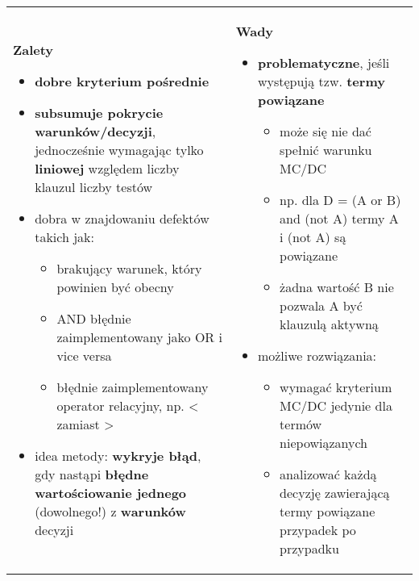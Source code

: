 \documentclass[../main.tex]{subfiles}
\begin{document}
    \begin{table}[H]
        \begin{center}
            \begin{tabular}{p{8cm} p{8cm}}
                \textbf{Zalety}
                \begin{itemize}
                    \item \textbf{dobre kryterium pośrednie}
                    \item \textbf{subsumuje pokrycie warunków/decyzji}, jednocześnie
                    wymagając tylko \textbf{liniowej} względem liczby klauzul liczby testów
                    \item dobra w znajdowaniu defektów takich jak:
                    \begin{itemize}
                        \item brakujący warunek, który powinien być obecny
                        \item AND błędnie zaimplementowany jako OR i vice versa
                        \item błędnie zaimplementowany operator relacyjny, np. < zamiast >
                    \end{itemize}
                    \item idea metody: \textbf{wykryje błąd}, gdy nastąpi \textbf{błędne wartościowanie jednego} (dowolnego!) z \textbf{warunków }decyzji
                \end{itemize}
                &
                \textbf{Wady}
                \begin{itemize}
                    \item \textbf{problematyczne}, jeśli występują tzw. \textbf{termy powiązane}
                    \begin{itemize}
                        \item może się nie dać spełnić warunku MC/DC
                        \item np. dla D = (A or B) and (not A) termy A i (not A) są powiązane
                        \item żadna wartość B nie pozwala A być klauzulą aktywną
                    \end{itemize}
                    \item możliwe rozwiązania:
                    \begin{itemize}
                        \item wymagać kryterium MC/DC jedynie dla termów niepowiązanych
                        \item analizować każdą decyzję zawierającą termy powiązane przypadek po przypadku

\end{itemize}
\end{itemize}
\end{tabular}
\end{center}
\end{table}
\end{document}
